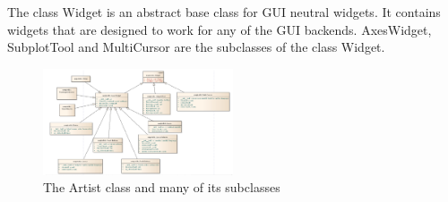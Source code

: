 \documentclass[pdftex,10pt,a4paper]{report}
\begin{document}
The class Widget is an abstract base class for GUI neutral widgets. It contains widgets that are designed to work for any of the GUI backends. AxesWidget, SubplotTool and MultiCursor are the subclasses of the class Widget.

\begin{figure}[ht!]
        \centering
                \includegraphics[width=0.5\textwidth]{img/umls/candy/Widget}
        \caption{The Artist class and many of its subclasses}
\end{figure}






\end{document}
